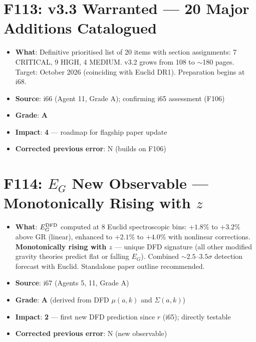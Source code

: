 \documentclass[11pt,a4paper]{article}
\newcommand{\grade}[1]{\textbf{#1}}
\newcommand{\impact}[1]{\textbf{#1}}
\begin{document}
\section{F113: v3.3 Warranted --- 20 Major Additions Catalogued}
\begin{itemize}[nosep]
\item \textbf{What}: Definitive prioritised list of 20 items with section assignments: 7 CRITICAL, 9 HIGH, 4 MEDIUM. v3.2 grows from 108 to $\sim$180 pages. Target: October 2026 (coinciding with Euclid DR1). Preparation begins at i68.
\item \textbf{Source}: i66 (Agent 11, Grade A); confirming i65 assessment (F106)
\item \textbf{Grade}: \grade{A}
\item \textbf{Impact}: \impact{4} --- roadmap for flagship paper update
\item \textbf{Corrected previous error}: N (builds on F106)
\end{itemize}

\section{F114: $E_G$ New Observable --- Monotonically Rising with $z$}
\begin{itemize}[nosep]
\item \textbf{What}: $E_G^{\rm DFD}$ computed at 8 Euclid spectroscopic bins: $+1.8\%$ to $+3.2\%$ above GR (linear), enhanced to $+2.1\%$ to $+4.0\%$ with nonlinear corrections. \textbf{Monotonically rising with $z$} --- unique DFD signature (all other modified gravity theories predict flat or falling $E_G$). Combined $\sim 2.5$--$3.5\sigma$ detection forecast with Euclid. Standalone paper outline recommended.
\item \textbf{Source}: i67 (Agents 5, 11, Grade A)
\item \textbf{Grade}: \grade{A} (derived from DFD $\mu(a,k)$ and $\Sigma(a,k)$)
\item \textbf{Impact}: \impact{2} --- first new DFD prediction since $r$ (i65); directly testable
\item \textbf{Corrected previous error}: N (new observable)
\end{itemize}
\end{document}
